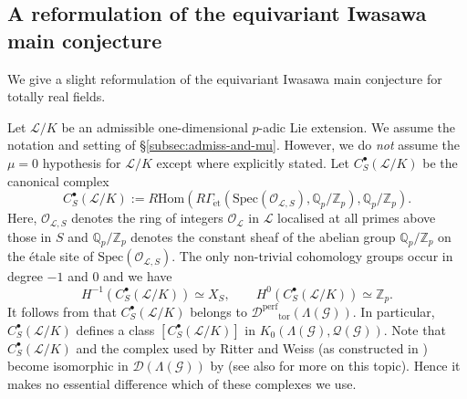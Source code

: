\documentclass[12pt]{amsart}
\theoremstyle{plain}
\theoremstyle{remark}
\theoremstyle{definition}
\numberwithin{equation}{section}
\begin{document}
\subsection{A reformulation of the equivariant Iwasawa main conjecture} \label{subsec:EIMC-reformulation}
We give a slight reformulation of the equivariant Iwasawa main conjecture for totally real fields.

Let $\mathcal{L}/K$ be an admissible one-dimensional $p$-adic Lie extension.
We assume the notation and setting of \S \ref{subsec:admiss-and-mu}.
However, we do \emph{not} assume the $\mu=0$ hypothesis for $\mathcal{L}/K$ except where explicitly stated.
Let $C_{S}^{\bullet}(\mathcal{L}/K)$ be the canonical complex
\[
    C_{S}^{\bullet}(\mathcal{L}/K) := R{\mathrm{Hom}}(R\Gamma_{\mathrm{\acute{e}t}}({\mathrm{Spec}}(\mathcal{O}_{\mathcal{L},S}), {\mathbb{Q}}_{p} / {\mathbb{Z}}_{p}), {\mathbb{Q}}_{p} / {\mathbb{Z}}_{p}).
\]
Here, $\mathcal{O}_{\mathcal{L},S}$ denotes the ring of integers $\mathcal{O}_{\mathcal{L}}$ in $\mathcal{L}$ localised at all primes above those in $S$
and
${\mathbb{Q}}_{p} / {\mathbb{Z}}_{p}$ denotes the constant sheaf of the abelian group ${\mathbb{Q}}_{p} / {\mathbb{Z}}_{p}$ on the \'{e}tale site
of ${\mathrm{Spec}}(\mathcal{O}_{\mathcal{L},S})$.
The only non-trivial cohomology groups occur in degree $-1$ and $0$ and we have
\[
H^{-1}(C_{S}^{\bullet}(\mathcal{L}/K)) \simeq X_{S}, \qquad H^{0}(C_{S}^{\bullet}(\mathcal{L}/K)) \simeq {\mathbb{Z}}_{p}.
\]
It follows from \cite[Proposition 1.6.5]{MR2276851} that $C_{S}^{\bullet}(\mathcal{L}/K)$ belongs to $\mathcal{D}^{\mathrm{perf}}{_{\mathrm{tor}}}(\Lambda(\mathcal{G}))$.
In particular, $C_{S}^{\bullet}(\mathcal{L}/K)$ defines a class $[C_{S}^{\bullet}(\mathcal{L}/K)]$ in $K_{0}(\Lambda(\mathcal{G}), \mathcal{Q}(\mathcal{G}))$.
Note that $C_{S}^{\bullet}(\mathcal{L}/K)$ and the complex used
by Ritter and Weiss (as constructed in \cite{MR2114937}) become isomorphic in $\mathcal{D}(\Lambda(\mathcal{G}))$ by
\cite[Theorem 2.4]{MR3072281} (see also \cite{MR3068897} for more on this topic).
Hence it makes no essential difference which of these complexes we use.
\end{document}
